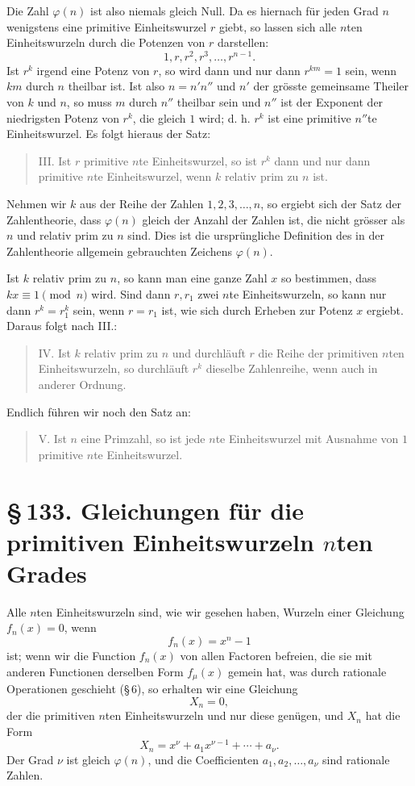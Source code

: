 \documentclass[11pt]{article}
\providecommand{\sect}[2]{\section*{\S\,#1. #2}}
\begin{document}
Die Zahl $\varphi(n)$ ist also niemals gleich Null. Da es hiernach für jeden Grad $n$ wenigstens eine primitive Einheitswurzel $r$ giebt, so lassen sich alle $n$ten Einheitswurzeln durch die Potenzen von $r$ darstellen:
\[
\tag{7}        1,r,r^2,r^3,\ldots,r^{n-1}.
\]
Ist $r^k$ irgend eine Potenz von $r$, so wird dann und nur dann $r^{km}=1$ sein, wenn $km$ durch $n$ theilbar ist. Ist also $n=n'n''$ und $n'$ der grösste gemeinsame Theiler von $k$ und $n$, so muss $m$ durch $n''$ theilbar sein und $n''$ ist der Exponent der niedrigsten Potenz von $r^k$, die gleich $1$ wird; d. h. $r^k$ ist eine primitive $n''$te Einheitswurzel. Es folgt hieraus der Satz:
\begin{quote}
III. Ist $r$ primitive $n$te Einheitswurzel, so ist $r^k$ dann und nur dann primitive $n$te Einheitswurzel, wenn $k$ relativ prim zu $n$ ist.
\end{quote}
Nehmen wir $k$ aus der Reihe der Zahlen $1,2,3,\ldots,n$, so ergiebt sich der Satz der Zahlentheorie, dass $\varphi(n)$ gleich der Anzahl der Zahlen ist, die nicht grösser als $n$ und relativ prim zu $n$ sind. Dies ist die ursprüngliche Definition des in der Zahlentheorie allgemein gebrauchten Zeichens $\varphi(n)$.

Ist $k$ relativ prim zu $n$, so kann man eine ganze Zahl $x$ so bestimmen, dass $kx\equiv1\pmod n$ wird. Sind dann $r,r_1$ zwei $n$te Einheitswurzeln, so kann nur dann $r^k=r_1^k$ sein, wenn $r=r_1$ ist, wie sich durch Erheben zur Potenz $x$ ergiebt. Daraus folgt nach III.:
\begin{quote}
IV. Ist $k$ relativ prim zu $n$ und durchläuft $r$ die Reihe der primitiven $n$ten Einheitswurzeln, so durchläuft $r^k$ dieselbe Zahlenreihe, wenn auch in anderer Ordnung.
\end{quote}
Endlich führen wir noch den Satz an:
\begin{quote}
V. Ist $n$ eine Primzahl, so ist jede $n$te Einheitswurzel mit Ausnahme von $1$ primitive $n$te Einheitswurzel.
\end{quote}

\sect{133}{Gleichungen für die primitiven Einheitswurzeln $n$ten Grades}

Alle $n$ten Einheitswurzeln sind, wie wir gesehen haben, Wurzeln einer Gleichung $f_n(x)=0$, wenn
\[
\tag{1}        f_n(x)=x^n-1
\]
ist; wenn wir die Function $f_n(x)$ von allen Factoren befreien, die sie mit anderen Functionen derselben Form $f_\mu(x)$ gemein hat, was durch rationale Operationen geschieht (\S\,6), so erhalten wir eine Gleichung
\[
        X_n=0,
\]
der die primitiven $n$ten Einheitswurzeln und nur diese genügen, und $X_n$ hat die Form
\[
\tag{2}        X_n=x^\nu+a_1x^{\nu-1}+\cdots+a_\nu.
\]
Der Grad $\nu$ ist gleich $\varphi(n)$, und die Coefficienten $a_1,a_2,\ldots,a_\nu$ sind rationale Zahlen.
\end{document}
